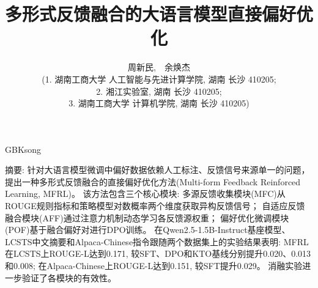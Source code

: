 

\makeatother
\begin{CJK*}{GBK}{song}
\renewcommand{\CJKglue}{\hskip -0.3pt plus 0.02\baselineskip}
\title{\LARGE\textbf{多形式反馈融合的大语言模型直接偏好优化}\\
}
\author{{\large {周新民\makebox{$^{\dag}$},~~余焕杰}}\\
\scriptsize
 (1. 湖南工商大学 人工智能与先进计算学院, 湖南 长沙 410205;\\
\scriptsize 2. 湘江实验室, 湖南 长沙 410205;\\
\scriptsize 3. 湖南工商大学 计算机学院, 湖南 长沙 410205) \\}
\date{}


\setlength{\abovedisplayskip}{1.5mm}
\setlength{\belowdisplayskip}{1.5mm}

\maketitle

\setlength{\oddsidemargin}{ 1cm}
\setlength{\textwidth}{15.5cm} \vspace{-1.2cm}
\begin{center}
\parbox{\textwidth}{\setlength{\parindent}{1em}
{\renewcommand{\CJKglue}{\hskip 0pt plus 5.5\baselineskip}
\footnotesize { 摘要:}
针对大语言模型微调中偏好数据依赖人工标注、反馈信号来源单一的问题，提出一种多形式反馈融合的直接偏好优化方法(Multi-form Feedback Reinforced Learning, MFRL)。
该方法包含三个核心模块: 多源反馈收集模块(MFC)从ROUGE规则指标和策略模型对数概率两个维度获取异构反馈信号；
自适应反馈融合模块(AFF)通过注意力机制动态学习各反馈源权重；
偏好优化微调模块(POF)基于融合偏好对进行DPO训练。
在Qwen2.5-1.5B-Instruct基座模型、LCSTS中文摘要和Alpaca-Chinese指令跟随两个数据集上的实验结果表明:
MFRL在LCSTS上ROUGE-L达到0.171, 较SFT、DPO和KTO基线分别提升0.020、0.013和0.008;
在Alpaca-Chinese上ROUGE-L达到0.151, 较SFT提升0.029。
消融实验进一步验证了各模块的有效性。

}}
\end{center}
\end{CJK*}
